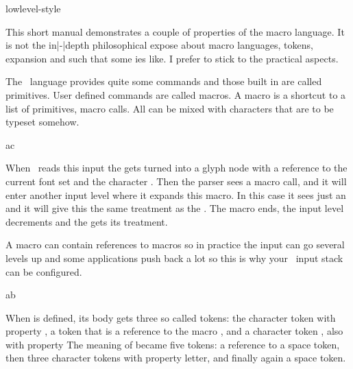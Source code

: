 

\environment lowlevel-style

\startdocument
  [title=expansion,
   color=middleyellow]

\startsection[title=Preamble]


This short manual demonstrates a couple of properties of the macro language. It
is not the in|-|depth philosophical expose about macro languages, tokens,
expansion and such that some \TEX ies like. I prefer to stick to the practical
aspects.

\stopsection

\startsection[title={\TEX\ primitives}]

The \TEX\ language provides quite some commands and those built in are called
primitives. User defined commands are called macros. A macro is a shortcut to a
list of primitives, macro calls. All can be mixed with characters that are to
be typeset somehow.

\starttyping[option=TEX]

a\MyMacro c
\stoptyping

When \TEX\ reads this input the  gets turned into a glyph node with a
reference to the current font set and the character . Then the parser
sees a macro call, and it will enter another input level where it expands this
macro. In this case it sees just an  and it will give this the same
treatment as the . The macro ends, the input level decrements and the
 gets its treatment.

A macro can contain references to macros so in practice the input can go several
levels up and some applications push back a lot so this is why your \TEX\ input
stack can be configured.

\starttyping[option=TEX]
\def\MyMacroB{1\MyMacroA 2}

a\MyMacroA b
\stoptyping

When \type {\MyMacroB} is defined, its body gets three so called tokens: the
character token  with property , a token that is a
reference to the macro \type {\MyMacroB}, and a character token , also
with property  The meaning of \type {\MyMacroA} became five tokens:
a reference to a space token, then three character tokens with property \quote
{letter}, and finally again a space token.

